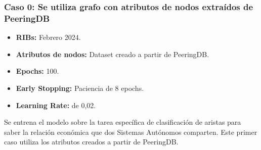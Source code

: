 \subsubsection{Caso 0: Se utiliza grafo con atributos de nodos extraídos de PeeringDB}

\begin{itemize}
    \item \textbf{RIBs:} Febrero 2024.
    \item \textbf{Atributos de nodos:} Dataset creado a partir de PeeringDB.
    \item \textbf{Epochs:} 100.
    \item \textbf{Early Stopping:} Paciencia de 8 epochs.
    \item \textbf{Learning Rate:} de 0,02.
\end{itemize}

Se entrena el modelo sobre la tarea específica de clasificación de aristas para saber la relación económica que dos Sistemas Autónomos comparten. Este primer caso utiliza los atributos creados a partir de PeeringDB.\\






